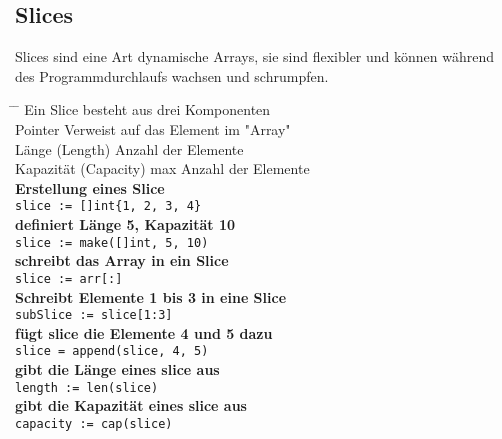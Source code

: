 \documentclass[twoside,a4paper,12pt]{article}
\begin{document}
\subsection{Slices}
Slices sind eine Art dynamische Arrays, sie sind flexibler und können während \\ 
des Programmdurchlaufs wachsen und schrumpfen.  
\begin{tabbing}
 \hspace{2mm} \= \hspace{50mm} \= \kill
 \> Ein Slice besteht aus drei Komponenten \\ 
 \> Pointer \> Verweist auf das Element im "Array" \\ 
 \> Länge (Length) \> Anzahl der Elemente \\ 
 \> Kapazität (Capacity) \> max Anzahl der Elemente \\ 
 \> \textbf{Erstellung eines Slice} \\
 \> \verb|slice := []int{1, 2, 3, 4}| \\ 
 \> \textbf{definiert Länge 5, Kapazität 10} \\ 
 \> \verb|slice := make([]int, 5, 10)| \\ 
 \> \textbf{schreibt das Array in ein Slice} \\
 \> \verb|slice := arr[:]| \\ 
 \> \textbf{Schreibt Elemente 1 bis 3 in eine Slice} \\ 
 \> \verb|subSlice := slice[1:3]| \\ 
 \> \textbf{fügt slice die Elemente 4 und 5 dazu} \\ 
 \> \verb|slice = append(slice, 4, 5)| \\  
 \> \textbf{gibt die Länge eines slice aus} \\ 
 \> \verb|length := len(slice)| \\ 
 \> \textbf{gibt die Kapazität eines slice aus} \\ 
 \> \verb|capacity := cap(slice)| \\
\end{tabbing}

\newpage
\end{document}
